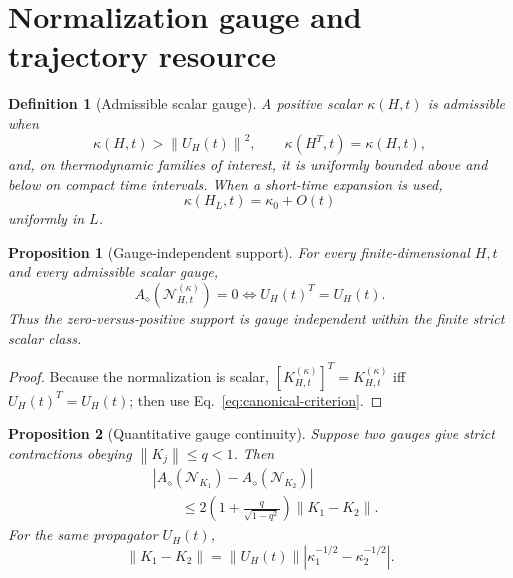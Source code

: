 \documentclass[reprint,amsmath,amssymb,aps,nofootinbib]{revtex4-2}
\newtheorem{definition}{Definition}
\newtheorem{proposition}{Proposition}
\newcommand{\norm}[1]{\left\lVert #1\right\rVert}
\begin{document}
\section{Normalization gauge and trajectory resource}
\label{sec:gauge}

\begin{definition}[Admissible scalar gauge]
A positive scalar $\kappa(H,t)$ is admissible when
\begin{equation}
\kappa(H,t)>\norm{U_H(t)}^2,
\qquad
\kappa(H^T,t)=\kappa(H,t),
\end{equation}
and, on thermodynamic families of interest, it is uniformly bounded above and below on compact
time intervals. When a short-time expansion is used,
\begin{equation}
\kappa(H_L,t)=\kappa_0+O(t)
\end{equation}
uniformly in $L$.
\end{definition}

\begin{proposition}[Gauge-independent support]
For every finite-dimensional $H,t$ and every admissible scalar gauge,
\begin{equation}
\boxed{
A_\diamond(\mathcal N_{H,t}^{(\kappa)})=0
\iff U_H(t)^T=U_H(t).
}
\end{equation}
Thus the zero-versus-positive support is gauge independent within the finite strict scalar class.
\end{proposition}

\begin{proof}
Because the normalization is scalar,
$[K_{H,t}^{(\kappa)}]^T=K_{H,t}^{(\kappa)}$ iff $U_H(t)^T=U_H(t)$; then use
Eq.~\eqref{eq:canonical-criterion}.
\end{proof}

\begin{proposition}[Quantitative gauge continuity]
Suppose two gauges give strict contractions obeying
$\norm{K_j}\le q<1$. Then
\begin{equation}
\boxed{\begin{aligned}
&\left|A_\diamond(\mathcal N_{K_1})-A_\diamond(\mathcal N_{K_2})\right|\\
&\qquad\le
2\left(1+\frac{q}{\sqrt{1-q^2}}\right)\norm{K_1-K_2}.
\end{aligned}}
\end{equation}
For the same propagator $U_H(t)$,
\begin{equation}
\norm{K_1-K_2}
=\norm{U_H(t)}
\left|\kappa_1^{-1/2}-\kappa_2^{-1/2}\right|.
\end{equation}
\end{proposition}
\end{document}
